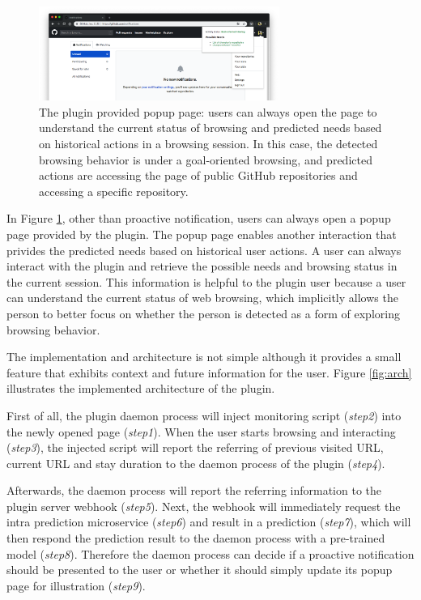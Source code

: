 \begin{figure}
    \centering
    \includegraphics[width=0.7\textwidth]{figures/plugin-predicting-result}
    \caption{The plugin provided popup page: users can always open the page
    to understand the current status of browsing and predicted needs based on
    historical actions in a browsing session. In this case, the detected browsing behavior
    is under a goal-oriented browsing, and predicted actions
    are accessing the page of public GitHub repositories and accessing a specific repository.}
    \label{fig:plugin-predict}
\end{figure}

In Figure \ref{fig:plugin-predict}, other than proactive notification, 
users can always open a popup page provided by the plugin.
The popup page enables another interaction that privides the predicted needs 
based on historical user actions. A user can always interact with the plugin and
retrieve the possible needs and browsing status in the current session.
This information is helpful to the plugin user because a user can understand
the current status of web browsing, which implicitly allows the person to better focus
on whether the person is detected as a form of exploring browsing behavior.

The implementation and architecture is not simple
although it provides a small feature that exhibits context and future information for the user.
Figure \ref{fig:arch} illustrates the implemented architecture of the plugin.

First of all, the plugin daemon process will inject monitoring script (\emph{step2}) into 
the newly opened page (\emph{step1}).
When the user starts browsing and interacting (\emph{step3}), the injected script will report the referring of
previous visited URL, current URL and stay duration to the daemon process of the plugin (\emph{step4}).

Afterwards, the daemon process will report the referring information to the plugin server webhook (\emph{step5}).
Next, the webhook will immediately request the intra prediction microservice (\emph{step6}) and result in a 
prediction (\emph{step7}), which will then respond the prediction result to the daemon process 
with a pre-trained model (\emph{step8}). Therefore the daemon process can decide 
if a proactive notification should be presented to the user or whether it should simply update its popup page
for illustration (\emph{step9}).

